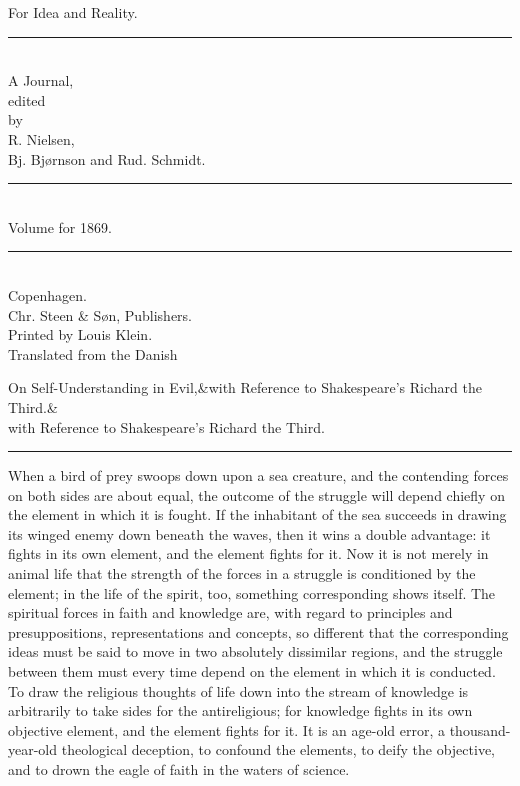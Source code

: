 \documentclass[12pt,a4paper,openany]{book}
\newcommand{\opage}[1]{\marginnote{\footnotesize\textit{[#1]}}}
\newcommand{\essayhead}[2]{\begin{center}{\large #1}\ifx&#2&\else\\[0.3em]{\normalsize #2}\fi\\[0.5em]\rule{3em}{0.4pt}\end{center}\medskip\noindent}
\begin{document}
\begin{titlepage}
\begin{center}
\vspace*{3em}
{\Huge For Idea and Reality.}\\[1em]
\rule{8em}{0.4pt}\\[1em]
{\large A Journal,}\\[0.8em]
{\small edited}\\[0.4em]
{\footnotesize by}\\[0.6em]
{\large R. Nielsen,}\\[0.4em]
{\large Bj. Bjørnson and Rud. Schmidt.}\\[1em]
\rule{8em}{0.4pt}\\[1em]
{\large Volume for 1869.}\\[1em]
\rule{8em}{0.4pt}\\[4em]
Copenhagen.\\[0.4em]
Chr. Steen \& Søn, Publishers.\\[1.5em]
{\small Printed by Louis Klein.}\\[3em]
{\small Translated from the Danish}
\end{center}
\end{titlepage}

\essayhead{On Self-Understanding in Evil,}{with Reference to Shakespeare's Richard the Third.}
\setcounter{footnote}{0}%
\opage{521}When a bird of prey swoops down upon a sea creature, and the contending
forces on both sides are about equal,
the outcome of the struggle will depend chiefly on the element
in which it is fought. If the inhabitant of the sea succeeds
in drawing its winged enemy down beneath the waves, then
it wins a double advantage: it fights in its own element,
and the element fights for it. Now it is not merely in
animal life that the strength of the forces in a struggle is conditioned
by the element; in the life of the spirit, too, something corresponding shows itself.
The spiritual forces in faith and knowledge are, with regard
to principles and presuppositions, representations and concepts,
so different that the corresponding ideas must
be said to move in two absolutely dissimilar regions,
and the struggle between them must every time depend on the element
in which it is conducted. To draw the religious thoughts of life
down into the stream of knowledge is arbitrarily to take sides for
the antireligious; for knowledge fights in its own objective element,
and the element fights for it. It is an age-old
error, a thousand-year-old theological deception, to confound
the elements, to deify the objective, and to drown
the eagle of faith in the waters of science.
\end{document}
